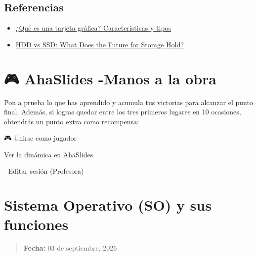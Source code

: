 \documentclass[
  spanish,
  12pt,
  letterpaper,
  DIV=11,
  numbers=noendperiod]{scrreprt}
\providecommand{\tightlist}{%
  \setlength{\itemsep}{0pt}\setlength{\parskip}{0pt}}
\begin{document}
\section{Referencias}\label{referencias-1}

\begin{itemize}
\tightlist
\item
  \href{https://www.pccomponentes.com/blog/como-elegir-tarjeta-grafica?srsltid=AfmBOooy3DQiJl1fueUUfqybAm1SY6TBkFWnRC-NQuIANQk9eJpnHqez}{¿Qué
  es una tarjeta gráfica? Características y tipos}
\item
  \href{https://medium.com/@rodbauer/hdd-vs-ssd-what-does-the-future-for-storage-hold-dc8653f16366}{HDD
  vs SSD: What Does the Future for Storage Hold?}
\end{itemize}

\chapter{\texorpdfstring{\textbf{🎮 AhaSlides -Manos a la
obra}}{🎮 AhaSlides -Manos a la obra}}\label{ahaslides--manos-a-la-obra}

\begin{tcolorbox}[enhanced jigsaw, arc=.35mm, bottomrule=.15mm, bottomtitle=1mm, breakable, colback=white, colbacktitle=quarto-callout-tip-color!10!white, colframe=quarto-callout-tip-color-frame, coltitle=black, left=2mm, leftrule=.75mm, opacityback=0, opacitybacktitle=0.6, rightrule=.15mm, title=\textcolor{quarto-callout-tip-color}{\faLightbulb}\hspace{0.5em}{AhaSlides Actividad}, titlerule=0mm, toprule=.15mm, toptitle=1mm]

Pon a prueba lo que has aprendido y acumula tus victorias para alcanzar
el punto final. Además, si logras quedar entre los tres primeros lugares
en 10 ocasiones, obtendrás un punto extra como recompensa:

🎮 Unirse como jugador

Ver la dinámica en AhaSlides

👩 Editar sesión (Profesora)

\end{tcolorbox}

\chapter{Sistema Operativo (SO) y sus
funciones}\label{sistema-operativo-so-y-sus-funciones}

\begin{quote}
\textbf{Fecha:} 03 de septiembre, 2026
\end{quote}
\end{document}
